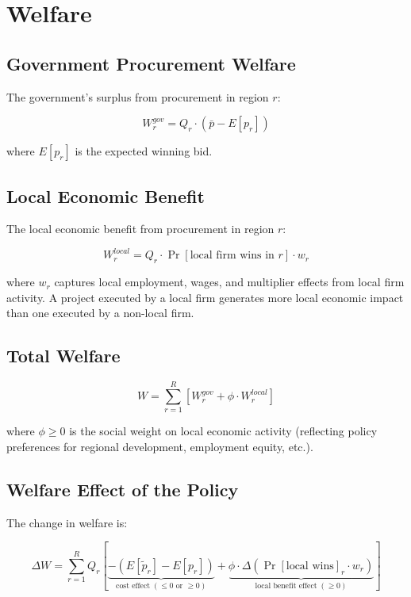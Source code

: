 \documentclass[10pt]{article}
\begin{document}
\section{Welfare}

\subsection{Government Procurement Welfare}

The government's surplus from procurement in region $r$:

\[
  W_r^{gov} = Q_r \cdot \left(\bar{p} - E[p_r]\right)
\]

where $E[p_r]$ is the expected winning bid.

\subsection{Local Economic Benefit}

The local economic benefit from procurement in region $r$:

\[
  W_r^{local} = Q_r \cdot \Pr[\text{local firm wins in } r] \cdot w_r
\]

where $w_r$ captures local employment, wages, and multiplier effects from local firm activity. A project executed by a local firm generates more local economic impact than one executed by a non-local firm.

\subsection{Total Welfare}

\[
  W = \sum_{r=1}^{R} \left[W_r^{gov} + \phi \cdot W_r^{local}\right]
\]

where $\phi \geq 0$ is the social weight on local economic activity (reflecting policy preferences for regional development, employment equity, etc.).

\subsection{Welfare Effect of the Policy}

The change in welfare is:

\[
  \Delta W = \sum_{r=1}^{R} Q_r
    \left[
      \underbrace{-(E[\tilde{p}_r] - E[p_r])}_{\text{cost effect}\;(\leq 0 \text{ or } \geq 0)}
      + \underbrace{\phi \cdot \Delta\!\left(\Pr[\text{local wins}]_r \cdot w_r\right)}_{\text{local benefit effect}\;(\geq 0)}
    \right]
\]
\end{document}
